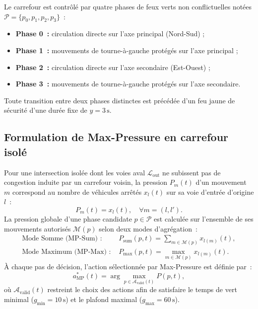 \documentclass[10pt,twocolumn,letterpaper]{article}
\begin{document}
Le carrefour est contrôlé par quatre phases de feux verts non conflictuelles notées $\mathcal{P} = \{p_0, p_1, p_2, p_3\}$~:
\begin{itemize}[nosep]
    \item \textbf{Phase 0~:} circulation directe sur l'axe principal (Nord-Sud) ;
    \item \textbf{Phase 1~:} mouvements de tourne-à-gauche protégés sur l'axe principal ;
    \item \textbf{Phase 2~:} circulation directe sur l'axe secondaire (Est-Ouest) ;
    \item \textbf{Phase 3~:} mouvements de tourne-à-gauche protégés sur l'axe secondaire.
\end{itemize}
Toute transition entre deux phases distinctes est précédée d'un feu jaune de sécurité d'une durée fixe de $y = 3\,\mathrm{s}$.

\subsection{Formulation de Max-Pressure en carrefour isolé}
Pour une intersection isolée dont les voies aval $\mathcal{L}_{\text{out}}$ ne subissent pas de congestion induite par un carrefour voisin, la pression $P_m(t)$ d'un mouvement $m$ correspond au nombre de véhicules arrêtés $x_l(t)$ sur sa voie d'entrée d'origine $l$~:
\begin{equation}
P_m(t) = x_l(t), \quad \forall m = (l, l').
\end{equation}
La pression globale d'une phase candidate $p \in \mathcal{P}$ est calculée sur l'ensemble de ses mouvements autorisés $\mathcal{M}(p)$ selon deux modes d'agrégation~:
\begin{align}
\text{Mode Somme (MP-Sum) : } & P_{\text{sum}}(p, t) = \sum_{m \in \mathcal{M}(p)} x_{l(m)}(t), \label{eq:mp_sum} \\
\text{Mode Maximum (MP-Max) : } & P_{\text{max}}(p, t) = \max_{m \in \mathcal{M}(p)} x_{l(m)}(t). \label{eq:mp_max}
\end{align}
À chaque pas de décision, l'action sélectionnée par Max-Pressure est définie par~:
\begin{equation}
a_{\text{MP}}^*(t) = \arg\max_{p \in \mathcal{A}_{\text{valid}}(t)} P(p, t),
\end{equation}
où $\mathcal{A}_{\text{valid}}(t)$ restreint le choix des actions afin de satisfaire le temps de vert minimal ($g_{\min} = 10\,\mathrm{s}$) et le plafond maximal ($g_{\max} = 60\,\mathrm{s}$).
\end{document}
